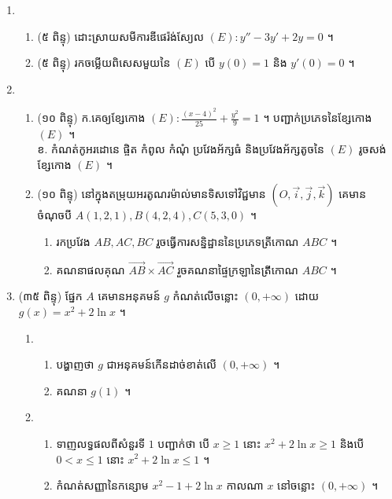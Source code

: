 \documentclass{officialexam}
\begin{document}
\begin{enumerate}[I]
\begin{enumerate}[1]
		\end{enumerate}
		\item \begin{enumerate}[k]
			\item{\color{khtug}(៥ ពិន្ទុ)} ដោះស្រាយសមីការឌីផេរ៉ង់ស្យែល $(E): y''-3y'+2y=0$ ។
			\item{\color{khtug}(៥ ពិន្ទុ)} រកចម្លើយពិសេសមួយនៃ $(E)$ បើ $y(0)=1$ និង $y'(0)=0$ ។
		\end{enumerate}
		\item \begin{enumerate}[1]
			\item{\color{khtug}(១០ ពិន្ទុ)} ក.គេឲ្យខ្សែកោង $(E): \frac{\left(x-4\right)^2}{25}+\frac{y^2}{9}=1$ ។ បញ្ជាក់ប្រភេទនៃខ្សែកោង $(E)$ ។\\
			ខ. កំណត់កូអរដោនេ ផ្ចិត កំពូល កំណុំ ប្រវែងអ័ក្សធំ និងប្រវែងអ័ក្សតូចនៃ $(E)$ រូចសង់ខ្សែកោង $(E)$ ។
			\item {\color{khtug}(១០ ពិន្ទុ)} នៅក្នុងតម្រុយអរតូណរម៉ាល់មានទិសទៅវិជ្ជមាន $\left(O,\vec{i}, \vec{j}, \vec{k}\right)$ គេមានចំណុចបី $A(1,2,1),B(4,2,4),C(5,3,0)$ ។
			\begin{enumerate}[k]
				\item រកប្រវែង $AB, AC, BC$ រួចធ្វើការសន្និដ្ឋាននៃប្រភេទត្រីកោណ $ABC$ ។
				\item គណនាផលគុណ $\overrightarrow{AB}\times\overrightarrow{AC}$ រួចគណនាផ្ទៃក្រឡានៃត្រីកោណ $ABC$ ។
			\end{enumerate}
		\end{enumerate}
		\item {\color{khtug}(៣៥ ពិន្ទុ) \sffamily ផ្នែក $A$} គេមានអនុគមន៍ $g$ កំណត់លើចន្លោះ $(0, +\infty)$ ដោយ $g(x)=x^2+2\ln x$ ។
		\begin{enumerate}[1]
			\item \begin{enumerate}[k]
				\item បង្ហាញថា $g$ ជាអនុគមន៍កើនដាច់ខាត់លើ $(0, +\infty)$ ។
				\item គណនា $g(1)$ ។
			\end{enumerate}
			\item \begin{enumerate}[k]
				\item ទាញលទ្ធផលពីសំនួរទី $1$ បញ្ជាក់ថា បើ $x\geq1$ នោះ $x^2+2\ln x\geq1$ និងបើ $0<x\leq1$ នោះ $x^2+2\ln x\leq1$ ។ 
				\item កំណត់សញ្ញានៃកន្សោម $x^2-1+2\ln x$ កាលណា $x$ នៅចន្លោះ $(0,+\infty)$ ។
			\end{enumerate}
		\end{enumerate}

\end{enumerate}
\end{document}
